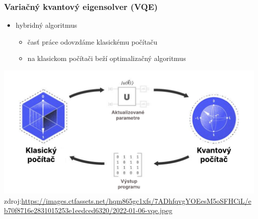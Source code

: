\documentclass{beamer}
\begin{document}
\begin{frame}
    \frametitle{Variačný kvantový eigensolver (VQE)}
	\begin{itemize}
        \item hybridný algoritmus
        \begin{itemize}
            \item časť práce odovzdáme klasickému počítaču
            \item na klasickom počítači beží optimalizačný algoritmus
        \end{itemize}
    \end{itemize}
    \includegraphics[width=1\textwidth]{vqe-hybrid-sk.pdf}
    \tiny zdroj:\url{https://images.ctfassets.net/hqm865gc1xfs/7ADhfqvgYOEesM5oSFHCiL/eb70f8716e2831015253e1eedced6320/2022-01-06-vqe.jpeg}  
    
\end{frame}
\end{document}
